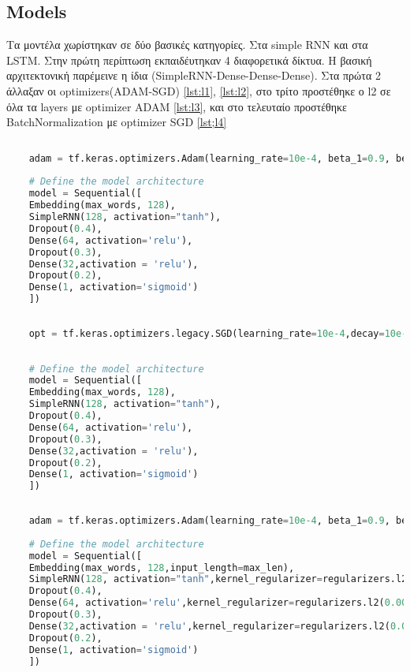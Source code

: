 \subsection{Models}

Τα μοντέλα χωρίστηκαν σε δύο βασικές κατηγορίες. Στα simple RNN και στα LSTM. Στην πρώτη περίπτωση εκπαιδέυτηκαν 4 διαφορετικά δίκτυα. Η βασική αρχιτεκτονική παρέμεινε η ίδια (SimpleRNN-Dense-Dense-Dense). Στα πρώτα 2 άλλαξαν οι optimizers(ADAM-SGD) \ref{lst:l1}, \ref{lst:l2},
στο τρίτο προστέθηκε ο l2 σε όλα τα layers με optimizer ADAM \ref{lst:l3}, και στο τελευταίο προστέθηκε BatchNormalization με optimizer SGD
\ref{lst;l4}



\begin{lstlisting}[language=Python, label={lst:l1},caption=First RNN]
	
	adam = tf.keras.optimizers.Adam(learning_rate=10e-4, beta_1=0.9, beta_2=0.999, epsilon=1e-7)
	
	# Define the model architecture
	model = Sequential([
	Embedding(max_words, 128),
	SimpleRNN(128, activation="tanh"),
	Dropout(0.4),
	Dense(64, activation='relu'),
	Dropout(0.3),
	Dense(32,activation = 'relu'),
	Dropout(0.2),
	Dense(1, activation='sigmoid')
	])
\end{lstlisting}


\begin{lstlisting}[language=Python,label={lst:l2}, caption=Second RNN]
	
	opt = tf.keras.optimizers.legacy.SGD(learning_rate=10e-4,decay=10e-6,momentum = 0.6)
	
	
	# Define the model architecture
	model = Sequential([
	Embedding(max_words, 128),
	SimpleRNN(128, activation="tanh"),
	Dropout(0.4),
	Dense(64, activation='relu'),
	Dropout(0.3),
	Dense(32,activation = 'relu'),
	Dropout(0.2),
	Dense(1, activation='sigmoid')
	])
\end{lstlisting}


\begin{lstlisting}[language=Python,label={lst:l3}, caption=Third RNN]
	
	adam = tf.keras.optimizers.Adam(learning_rate=10e-4, beta_1=0.9, beta_2=0.999, epsilon=1e-7)
	
	# Define the model architecture
	model = Sequential([
	Embedding(max_words, 128,input_length=max_len),
	SimpleRNN(128, activation="tanh",kernel_regularizer=regularizers.l2(0.00001)),
	Dropout(0.4),
	Dense(64, activation='relu',kernel_regularizer=regularizers.l2(0.00001)),
	Dropout(0.3),
	Dense(32,activation = 'relu',kernel_regularizer=regularizers.l2(0.00001)),
	Dropout(0.2),
	Dense(1, activation='sigmoid')
	])
\end{lstlisting}


